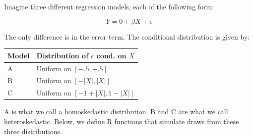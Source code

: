 \documentclass[
]{book}
\theoremstyle{definition}
\theoremstyle{definition}
\theoremstyle{definition}
\theoremstyle{definition}
\theoremstyle{remark}
\begin{document}
Imagine three different regression models, each of the following form:

\[
  Y = 0 + \beta X + \epsilon
\]

The only difference is in the error term. The conditional distribution is given by:

\begin{longtable}[]{@{}ll@{}}
\toprule\noalign{}
Model & Distribution of \(\epsilon\) cond. on \(X\) \\
\midrule\noalign{}
\endhead
\bottomrule\noalign{}
\endlastfoot
A & Uniform on \([-.5, +.5]\) \\
B & Uniform on \([ - |X|, |X| ]\) \\
C & Uniform on \([ -1 + |X|, 1- |X| ]\) \\
\end{longtable}

A is what we call a homoskedastic distribution. B and C are what we call heteroskedastic. Below, we define R functions that simulate draws from these three distributions.
\end{document}
